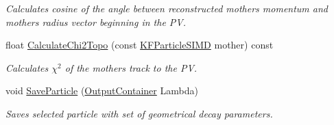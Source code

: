 \begin{DoxyCompactItemize}
\begin{DoxyCompactList}\small\item\em Calculates cosine of the angle between reconstructed mother\textquotesingle{}s momentum and mother\textquotesingle{}s radius vector beginning in the PV. \end{DoxyCompactList}\item 
float \hyperlink{classSimpleFinder_a8f5b04879c31465d5ef061f43bc5a74a}{Calculate\+Chi2\+Topo} (const \hyperlink{classKFParticleSIMD}{K\+F\+Particle\+S\+I\+MD} mother) const \hypertarget{classSimpleFinder_a8f5b04879c31465d5ef061f43bc5a74a}{}\label{classSimpleFinder_a8f5b04879c31465d5ef061f43bc5a74a}

\begin{DoxyCompactList}\small\item\em Calculates $\chi^2$ of the mother\textquotesingle{}s track to the PV. \end{DoxyCompactList}\item 
void \hyperlink{classSimpleFinder_af48bcd80810a3c514379ebd68f88f83c}{Save\+Particle} (\hyperlink{classOutputContainer}{Output\+Container} Lambda)\hypertarget{classSimpleFinder_af48bcd80810a3c514379ebd68f88f83c}{}\label{classSimpleFinder_af48bcd80810a3c514379ebd68f88f83c}

\begin{DoxyCompactList}\small\item\em Saves selected particle with set of geometrical decay parameters. \end{DoxyCompactList}\end{DoxyCompactItemize}

